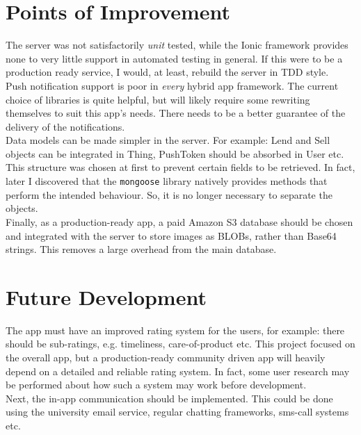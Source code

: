 \section{Points of Improvement}

The server was not satisfactorily \textit{unit} tested, while the Ionic framework provides none to very little support in automated testing in general. If this were to be a production ready service, I would, at least, rebuild the server in TDD style.\\

Push notification support is poor in \textit{every} hybrid app framework. The current choice of libraries is quite helpful, but will likely require some rewriting themselves to suit this app's needs. There needs to be a better guarantee of the delivery of the notifications.\\

Data models can be made simpler in the server. For example: Lend and Sell objects can be integrated in Thing, PushToken should be absorbed in User etc. This structure was chosen at first to prevent certain fields to be retrieved. In fact, later I discovered that the \texttt{mongoose} library natively provides methods that perform the intended behaviour. So, it is no longer necessary to separate the objects.\\

Finally, as a production-ready app, a paid Amazon S3 database should be chosen and integrated with the server to store images as BLOBs, rather than Base64 strings. This removes a large overhead from the main database.

\section{Future Development}

The app must have an improved rating system for the users, for example: there should be sub-ratings, e.g. timeliness, care-of-product etc. This project focused on the overall app, but a production-ready community driven app will heavily depend on a detailed and reliable rating system. In fact, some user research may be performed about how such a system may work before development.\\

Next, the in-app communication should be implemented. This could be done using the university email service, regular chatting frameworks, sms-call systems etc.\\

